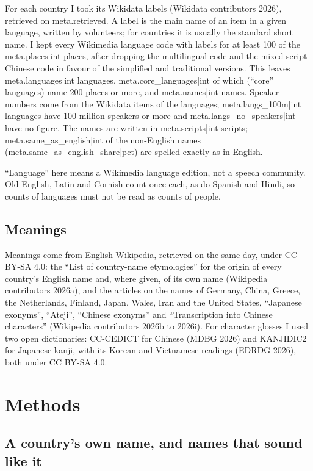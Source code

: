\documentclass[11pt,a4paper]{article}
\begin{document}
For each country I took its Wikidata labels (Wikidata contributors 2026), retrieved on {{meta.retrieved}}. A label is the main name of an item in a given language, written by volunteers; for countries it is usually the standard short name. I kept every Wikimedia language code with labels for at least 100 of the {{meta.places|int}} places, after dropping the multilingual code and the mixed-script Chinese code in favour of the simplified and traditional versions. This leaves {{meta.languages|int}} languages, {{meta.core_languages|int}} of which (``core'' languages) name 200 places or more, and {{meta.names|int}} names. Speaker numbers come from the Wikidata items of the languages; {{meta.langs_100m|int}} languages have 100 million speakers or more and {{meta.langs_no_speakers|int}} have no figure. The names are written in {{meta.scripts|int}} scripts; {{meta.same_as_english|int}} of the non-English names ({{meta.same_as_english_share|pct}}) are spelled exactly as in English.

``Language'' here means a Wikimedia language edition, not a speech community. Old English, Latin and Cornish count once each, as do Spanish and Hindi, so counts of languages must not be read as counts of people.

\subsection{Meanings}

Meanings come from English Wikipedia, retrieved on the same day, under CC BY-SA 4.0: the ``List of country-name etymologies'' for the origin of every country's English name and, where given, of its own name (Wikipedia contributors 2026a), and the articles on the names of Germany, China, Greece, the Netherlands, Finland, Japan, Wales, Iran and the United States, ``Japanese exonyms'', ``Ateji'', ``Chinese exonyms'' and ``Transcription into Chinese characters'' (Wikipedia contributors 2026b to 2026i). For character glosses I used two open dictionaries: CC-CEDICT for Chinese (MDBG 2026) and KANJIDIC2 for Japanese kanji, with its Korean and Vietnamese readings (EDRDG 2026), both under CC BY-SA 4.0.

\section{Methods}

\subsection{A country's own name, and names that sound like it}
\end{document}
